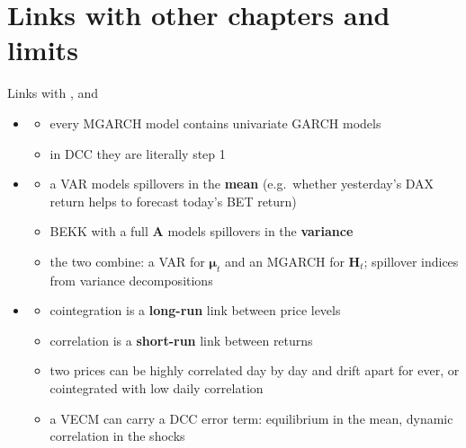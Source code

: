\section{Links with other chapters and limits}

\begin{frame}{Links with ,  and }
\itemsize{\small}
\begin{itemize}
    \item \textbf{}
    \begin{itemize}
        \item every MGARCH model contains univariate GARCH models
        \item in DCC they are literally step 1
    \end{itemize}
    \item \textbf{}
    \begin{itemize}
        \item a VAR models spillovers in the \textbf{mean} (e.g.\ whether yesterday's DAX return helps to forecast today's BET return)
        \item BEKK with a full $\mathbf{A}$ models spillovers in the \textbf{variance}
        \item the two combine: a VAR for $\boldsymbol{\mu}_t$ and an MGARCH for $\mathbf{H}_t$; spillover indices from variance decompositions 
    \end{itemize}
    \item \textbf{}
    \begin{itemize}
        \item cointegration is a \textbf{long-run} link between price levels
        \item correlation is a \textbf{short-run} link between returns
        \item two prices can be highly correlated day by day and drift apart for ever, or cointegrated with low daily correlation
        \item a VECM can carry a DCC error term: equilibrium in the mean, dynamic correlation in the shocks
    \end{itemize}
\end{itemize}
\end{frame}


